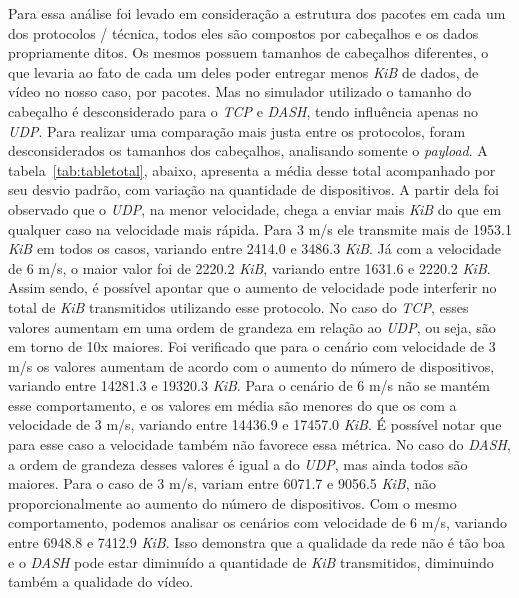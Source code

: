\documentclass[12pt]{article}
\begin{document}
	Para essa análise foi levado em consideração a estrutura dos pacotes em cada um dos protocolos / técnica, todos eles são compostos por cabeçalhos e os dados propriamente ditos. Os mesmos possuem tamanhos de cabeçalhos diferentes, o que levaria ao fato de cada um deles poder entregar menos \textit{KiB} de dados, de vídeo no nosso caso, por pacotes. Mas no simulador utilizado o tamanho do cabeçalho é desconsiderado para o \textit{TCP} e \textit{DASH}, tendo influência apenas no \textit{UDP}. Para realizar uma comparação mais justa entre os protocolos, foram desconsiderados os tamanhos dos cabeçalhos, analisando somente o \textit{payload}. A tabela~\ref{tab:tabletotal}, abaixo, apresenta a média desse total acompanhado por seu desvio padrão, com variação na quantidade de dispositivos. A partir dela foi observado que o \textit{UDP}, na menor velocidade, chega a enviar mais \textit{KiB} do que em qualquer caso na velocidade mais rápida. Para 3 m/s ele transmite mais de 1953.1 \textit{KiB} em todos os casos, variando entre 2414.0 e 3486.3 \textit{KiB}. Já com a velocidade de 6 m/s, o maior valor foi de 2220.2 \textit{KiB}, variando entre 1631.6 e 2220.2 \textit{KiB}. Assim sendo, é possível apontar que o aumento de velocidade pode interferir no total de \textit{KiB} transmitidos utilizando esse protocolo. No caso do \textit{TCP}, esses valores aumentam em uma ordem de grandeza em relação ao \textit{UDP}, ou seja, são em torno de 10x maiores. Foi verificado que para o cenário com velocidade de 3 m/s os valores aumentam de acordo com o aumento do número de dispositivos, variando entre 14281.3 e 19320.3 \textit{KiB}. Para o cenário de 6 m/s não se mantém esse comportamento, e os valores em média são menores do que os com a velocidade de 3 m/s, variando entre 14436.9 e 17457.0 \textit{KiB}. É possível notar que para esse caso a velocidade também não favorece essa métrica. No caso do \textit{DASH}, a ordem de grandeza desses valores é igual a do \textit{UDP}, mas ainda todos são maiores. Para o caso de 3 m/s, variam entre 6071.7 e 9056.5 \textit{KiB}, não proporcionalmente ao aumento do número de dispositivos. Com o mesmo comportamento, podemos analisar os cenários com velocidade de 6 m/s, variando entre 6948.8 e 7412.9 \textit{KiB}. Isso demonstra que a qualidade da rede não é tão boa e o \textit{DASH} pode estar diminuído a quantidade de \textit{KiB} transmitidos, diminuindo também a qualidade do vídeo.
    
\end{document}
